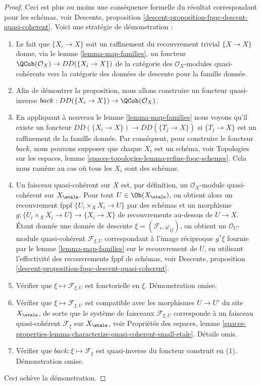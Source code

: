 \begin{proof}
Ceci est plus ou moins une conséquence formelle du
résultat correspondant pour les schémas, voir
Descente, proposition \ref{descent-proposition-fpqc-descent-quasi-coherent}.
Voici une stratégie de démonstration :
\begin{enumerate}
\item Le fait que $\{X_i \to X\}$ soit un raffinement du recouvrement trivial
$\{X \to X\}$ donne, via
le lemme \ref{lemma-map-families},
un foncteur $\QCoh(\mathcal{O}_X) \to DD(\{X_i \to X\})$ de la
catégorie des $\mathcal{O}_X$-modules quasi-cohérents vers la catégorie des
données de descente pour la famille donnée.
\item Afin de démontrer la proposition, nous allons construire un
foncteur quasi-inverse
$back : DD(\{X_i \to X\}) \to \QCoh(\mathcal{O}_X)$.
\item En appliquant à nouveau
le lemme \ref{lemma-map-families}
nous voyons qu'il existe un foncteur
$DD(\{X_i \to X\}) \to DD(\{T_j \to X\})$
si $\{T_j \to X\}$ est un raffinement de la famille donnée.
Par conséquent, pour construire le foncteur $back$, nous pouvons supposer que
chaque $X_i$ est un schéma, voir
Topologies sur les espaces,
lemme \ref{spaces-topologies-lemma-refine-fpqc-schemes}.
Cela nous ramène au cas où tous les $X_i$ sont des schémas.
\item Un faisceau quasi-cohérent sur $X$ est, par définition, un
$\mathcal{O}_X$-module quasi-cohérent sur $X_\etale$. Pour tout
$U \in \Ob(X_\etale)$, on obtient alors un recouvrement fppf
$\{U_i \times_X X_i \to U\}$ par des schémas et un morphisme
$g : \{U_i \times_X X_i \to U\} \to \{X_i \to X\}$ de recouvrements
au-dessus de $U \to X$. Étant donnée une donnée de descente
$\xi = (\mathcal{F}_i, \varphi_{ij})$, on obtient un
$\mathcal{O}_U$-module quasi-cohérent $\mathcal{F}_{\xi, U}$ correspondant
à l'image réciproque $g^*\xi$ fournie par le
lemme \ref{lemma-map-families}
sur le recouvrement de $U$, en utilisant l'effectivité des recouvrements fppf de schémas, voir
Descente, proposition \ref{descent-proposition-fpqc-descent-quasi-coherent}.
\item Vérifier que $\xi \mapsto \mathcal{F}_{\xi, U}$ est fonctorielle en $\xi$.
Démonstration omise.
\item Vérifier que $\xi \mapsto \mathcal{F}_{\xi, U}$ est compatible
avec les morphismes $U \to U'$ du site $X_\etale$, de sorte que
le système de faisceaux $\mathcal{F}_{\xi, U}$ corresponde à un faisceau quasi-cohérent
$\mathcal{F}_\xi$ sur $X_\etale$, voir
Propriétés des espaces,
lemme \ref{spaces-properties-lemma-characterize-quasi-coherent-small-etale}.
Détails omis.
\item Vérifier que $back : \xi \mapsto \mathcal{F}_\xi$ est quasi-inverse
du foncteur construit en (1). Démonstration omise.
\end{enumerate}
Ceci achève la démonstration.
\end{proof}









